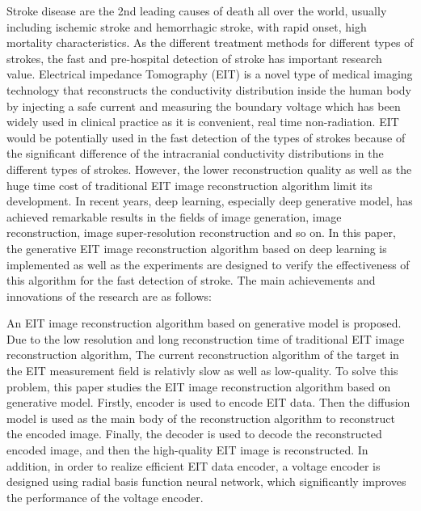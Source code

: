 
\begin{englishabstract}

    Stroke disease are the 2nd leading causes of death all over the world, usually including ischemic stroke and hemorrhagic stroke, with rapid onset, high mortality characteristics.
As the different treatment methods for different types of strokes, the fast and pre-hospital detection of stroke has important research value. Electrical impedance Tomography (EIT) is a novel type of medical imaging technology that reconstructs the conductivity distribution inside the human body by injecting a safe current and measuring the boundary voltage which has been widely used in clinical practice as it is convenient, real time non-radiation. EIT would be potentially used in the fast detection of the types of strokes because of the significant difference of the intracranial conductivity distributions in the different types of strokes. However, the lower reconstruction quality as well as the huge time cost of traditional EIT image reconstruction algorithm limit its development. In recent years, deep learning, especially deep generative model, has achieved remarkable results in the fields of image generation, image reconstruction, image super-resolution reconstruction and so on. In this paper, the generative EIT image reconstruction algorithm based on deep learning is implemented as well as the experiments are designed to verify the effectiveness of this algorithm for the fast detection of stroke. The main achievements and innovations of the research are as follows:

An EIT image reconstruction algorithm based on generative model is proposed. 
Due to the low resolution and long reconstruction time of traditional EIT image reconstruction algorithm,
The current reconstruction algorithm of the target in the EIT measurement field is relativly slow as well as low-quality.
To solve this problem, this paper studies the EIT image reconstruction algorithm based on generative model.
Firstly, encoder is used to encode EIT data. 
Then the diffusion model is used as the main body of the reconstruction algorithm to reconstruct the encoded image.
Finally, the decoder is used to decode the reconstructed encoded image, 
and then the high-quality EIT image is reconstructed. 
In addition, in order to realize efficient EIT data encoder, 
a voltage encoder is designed using radial basis function neural network,
which significantly improves the performance of the voltage encoder.


\end{englishabstract}
